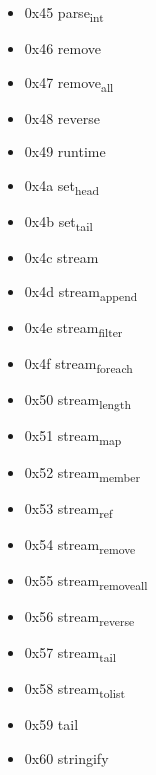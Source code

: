 \begin{itemize}
\item 0x45 parse\textsubscript{int}

\item 0x46 remove

\item 0x47 remove\textsubscript{all}

\item 0x48 reverse

\item 0x49 runtime

\item 0x4a set\textsubscript{head}

\item 0x4b set\textsubscript{tail}

\item 0x4c stream

\item 0x4d stream\textsubscript{append}

\item 0x4e stream\textsubscript{filter}

\item 0x4f stream\textsubscript{for}\textsubscript{each}

\item 0x50 stream\textsubscript{length}

\item 0x51 stream\textsubscript{map}

\item 0x52 stream\textsubscript{member}

\item 0x53 stream\textsubscript{ref}

\item 0x54 stream\textsubscript{remove}

\item 0x55 stream\textsubscript{remove}\textsubscript{all}

\item 0x56 stream\textsubscript{reverse}

\item 0x57 stream\textsubscript{tail}

\item 0x58 stream\textsubscript{to}\textsubscript{list}

\item 0x59 tail

\item 0x60 stringify
\end{itemize}

